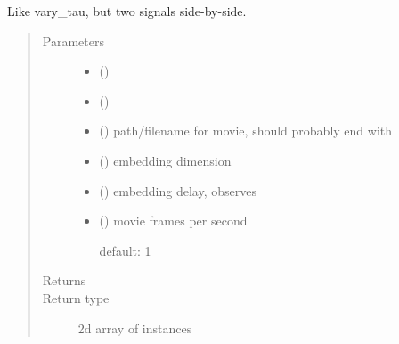 \documentclass[letterpaper,10pt,openany,oneside,english]{sphinxmanual}
\begin{document}
\begin{fulllineitems}
\label{\detokenize{embed:embed.movies.compare_vary_tau}}
Like vary\_tau, but two signals side-by-side.
\begin{quote}\begin{description}
\item[{Parameters}] \leavevmode\begin{itemize}
\item {} 
 ({\hyperref[\detokenize{signals:signals.TimeSeries}]{}}) \textendash{} 

\item {} 
 ({\hyperref[\detokenize{signals:signals.TimeSeries}]{}}) \textendash{} 

\item {} 
 () \textendash{} path/filename for movie, should probably end with 

\item {} 
 () \textendash{} embedding dimension

\item {} 
 () \textendash{} embedding delay, observes 

\item {} 
 (\sphinxstyleliteralemphasis{, }) \textendash{} 
movie frames per second

default: 1


\end{itemize}

\item[{Returns}] \leavevmode
{}

\item[{Return type}] \leavevmode
2d array of  instances

\end{description}\end{quote}

\end{fulllineitems}
\end{document}

